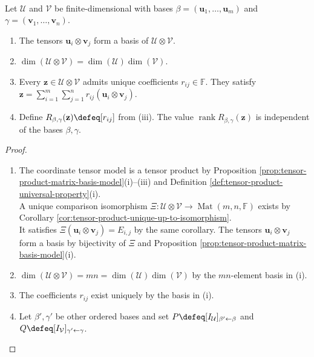 \begin{theorem} \label{thm:tensor-bases-dimension-and-rank} \\
Let $\mathcal{U}$ and $\mathcal{V}$ be finite-dimensional with bases $\beta=(\mathbf{u}_1,\ldots,\mathbf{u}_m)$ and $\gamma=(\mathbf{v}_1,\ldots,\mathbf{v}_n)$.
\begin{enumerate}[label=(\roman*)]
\setlength{\itemsep}{0pt}
\item The tensors $\mathbf{u}_i\otimes\mathbf{v}_j$ form a basis of $\mathcal{U}\otimes\mathcal{V}$.
\item $\dim(\mathcal{U}\otimes\mathcal{V})=\dim(\mathcal{U})\dim(\mathcal{V})$.
\item Every $\mathbf{z}\in\mathcal{U}\otimes\mathcal{V}$ admits unique coefficients $r_{ij}\in\mathbb{F}$. They satisfy $\mathbf{z}=\sum\limits_{i=1}^{m}\sum\limits_{j=1}^{n}r_{ij}(\mathbf{u}_i\otimes\mathbf{v}_j)$.
\item Define $R_{\beta,\gamma}(\mathbf{z})\defeq[r_{ij}]$ from (iii). The value $\operatorname{rank}R_{\beta,\gamma}(\mathbf{z})$ is independent of the bases $\beta,\gamma$.
\end{enumerate}
\begin{proof}
\begin{enumerate}[label=(\roman*)]
\setlength{\itemsep}{0pt}
\item The coordinate tensor model is a tensor product by Proposition \ref{prop:tensor-product-matrix-basis-model}(i)--(iii) and Definition \ref{def:tensor-product-universal-property}(i).\\
A unique comparison isomorphism $\Xi:\mathcal{U}\otimes\mathcal{V}\to\operatorname{Mat}(m,n,\mathbb{F})$ exists by Corollary \ref{cor:tensor-product-unique-up-to-isomorphism}.\\
It satisfies $\Xi(\mathbf{u}_i\otimes\mathbf{v}_j)=E_{i,j}$ by the same corollary. The tensors $\mathbf{u}_i\otimes\mathbf{v}_j$ form a basis by bijectivity of $\Xi$ and Proposition \ref{prop:tensor-product-matrix-basis-model}(i).
\item $\dim(\mathcal{U}\otimes\mathcal{V})=mn=\dim(\mathcal{U})\dim(\mathcal{V})$ by the $mn$-element basis in (i).
\item The coefficients $r_{ij}$ exist uniquely by the basis in (i).
\item Let $\beta',\gamma'$ be other ordered bases and set $P\defeq[I_{\mathcal{U}}]_{\beta'\leftarrow\beta}$ and $Q\defeq[I_{\mathcal{V}}]_{\gamma'\leftarrow\gamma}$.\\

\end{enumerate}
\end{proof}
\end{theorem}
